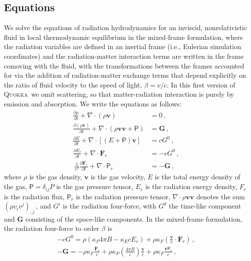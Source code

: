 \documentclass[fleqn,usenatbib]{mnras}
\newcommand{\vc}[1]{{\mathbf{#1}}}
\newcommand{\quokka}{\textsc{Quokka}}
\begin{document}
\subsection{Equations}
We solve the equations of radiation hydrodynamics \citep{Pomraning_1973,Mihalas_1984,Castor_2004} for an inviscid, nonrelativistic fluid in local thermodynamic equilibrium in the mixed-frame formulation, where the radiation variables are defined in an inertial frame (i.e., Eulerian simulation coordinates) and the radiation-matter interaction terms are written in the frame comoving with the fluid, with the transformations between the frames accounted for via the addition of radiation-matter exchange terms that depend explicitly on the ratio of fluid velocity to the speed of light, $\beta=v/c$. In this first version of \quokka~we omit scattering, so that matter-radiation interaction is purely by emission and absorption. We write the equations as follows:
\begin{align}
    \frac{\partial \rho}{\partial t} + \nabla \cdot (\rho \vc{v}) &= 0 \, , \\
    \frac{\partial (\rho \vc{v})}{\partial t} + \nabla \cdot (\rho \vc{v} \vc{v} + \mathsf{P}) &= \vc{G} \, , \\
    \frac{\partial E}{\partial t} + \nabla \cdot \left[(E + \mathsf{P})\vc{v}\right] &= c G^0 \, , \\
    \frac{\partial E_r}{\partial t} + \nabla \cdot {\vc{F}_r} &= -c G^0 \, , \\\
    \frac{1}{c^2}\frac{\partial \vc{F}_r}{\partial t} + \nabla \cdot \mathsf{P}_r &= -\vc{G} \, ,
\end{align}
where $\rho$ is the gas density, $\vc{v}$ is the gas velocity, $E$ is the total energy density of the gas, $\mathsf{P} = \delta_{ij} P$ is the gas pressure tensor, $E_r$ is the radiation energy density, $F_r$ is the radiation flux, $\mathsf{P}_r$ is the radiation pressure tensor, $\nabla \cdot \rho \vc{v} \vc{v}$ denotes the sum $(\rho v_i v^j)_{,j}\,$, and $G^i$ is the radiation four-force, with $G^0$ the time-like component and $\vc{G}$ consisting of the space-like components. In the mixed-frame formulation, the radiation four-force to order $\beta$ is
\begin{align}
-c G^0 = \rho (\kappa_P 4 \pi B - \kappa_E c E_r) + \rho \kappa_F \left( \frac{\vc{v}}{c} \cdot \vc{F}_r \right) \, , \\
-\vc{G} = -\rho \kappa_F \frac{\vc{F}_r}{c} + \rho \kappa_P \left(\frac{4 \pi B}{c}\right) \frac{\vc{v}}{c} + \rho \kappa_F \frac{\vc{v}\mathsf{P}_r}{c} \, ,
\end{align}
\end{document}
